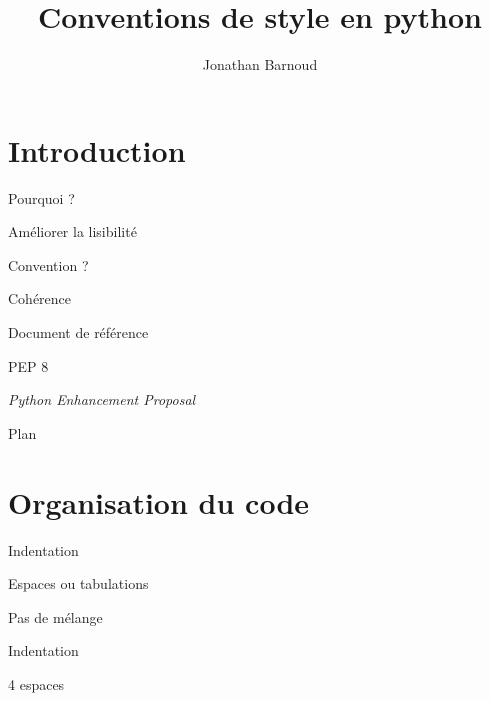\documentclass[xcolor=pdftex,dvipsnames,table,handout]{beamer}
\title{Conventions de style en python}
\author{Jonathan Barnoud}
\date{}
\begin{document}
\titleframe{}

\section*{Introduction}

\begin{frame}{Pourquoi ?}
\begin{center}
\Huge{Améliorer la lisibilité}
\end{center}
\end{frame}

\begin{frame}{Convention ?}
\begin{center}
\Huge{Cohérence}
\vspace{1cm}

\Large{}
\end{center}
\end{frame}

\begin{frame}{Document de référence}
\begin{center}
\Huge{PEP 8}
\vspace{1cm}

\Large{\textit{Python Enhancement Proposal}}
\end{center}
\end{frame}


\begin{frame}{Plan}
\tableofcontents
\end{frame}

\section{Organisation du code}

\begin{frame}{Indentation}
\begin{center}
\Large{Espaces ou tabulations}
\vspace{2cm}

\Large{Pas de mélange}
\end{center}
\end{frame}

\begin{frame}{Indentation}
\begin{center}
\Huge{4 espaces}
\end{center}
\end{frame}
\end{document}
